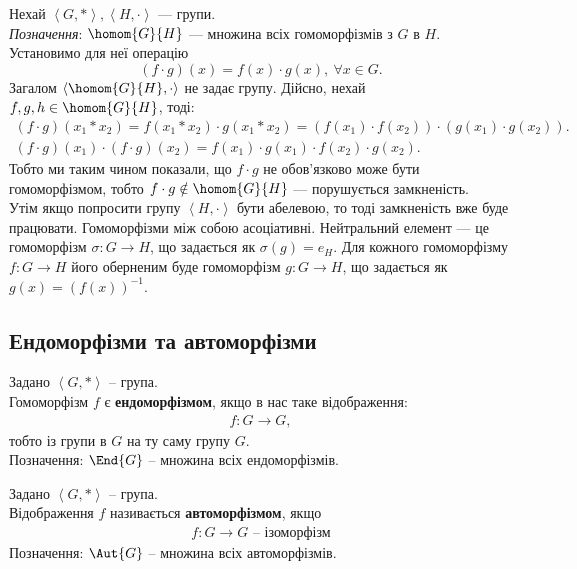 \documentclass{math_library}
\begin{document}
Нехай $\left< G, * \right>, \left< H, \cdot \right>$ --- групи.\\
\textit{Позначення}: $\homom{G}{H}$ --- множина всіх гомоморфізмів з $G$ в $H$.\\
Установимо для неї операцію 
\[
(f \cdot g)(x) = f(x) \cdot g(x),\ \forall x \in G.
\]
Загалом $\left< \homom{G}{H}, \cdot \right>$ не задає групу. Дійсно, нехай $f,g,h \in \homom{G}{H}$, тоді:
\begin{align*}
(f \cdot g)(x_1 * x_2) = f(x_1 * x_2) \cdot g(x_1 * x_2) = (f(x_1) \cdot f(x_2)) \cdot (g(x_1) \cdot g(x_2)). \\
(f \cdot g)(x_1) \cdot (f \cdot g)(x_2) = f(x_1) \cdot g(x_1) \cdot f(x_2) \cdot g(x_2).
\end{align*}
Тобто ми таким чином показали, що $f \cdot g$ не обов'язково може бути гомоморфізмом, тобто $f \cdot g \notin \homom{G}{H}$ --- порушується замкненість.
\bigskip \\
Утім якщо попросити групу $\left< H,\cdot \right>$ бути абелевою, то тоді замкненість вже буде працювати. Гомоморфізми між собою асоціативні. Нейтральний елемент --- це гомоморфізм $\sigma \colon G \to H$, що задається як $\sigma(g) = e_H$. Для кожного гомоморфізму $f \colon G \to H$ його оберненим буде гомоморфізм $g \colon G \to H$, що задається як $g(x) = (f(x))^{-1}$.


\iffalse
\subsection{Ендоморфізми та автоморфізми}
\begin{definition}
Задано $\left< G, * \right>$ -- група.\\
Гомоморфізм $f$ є \textbf{ендоморфізмом}, якщо в нас таке відображення:
\begin{align*}
f \colon G \to G,
\end{align*}
тобто із групи в $G$ на ту саму групу $G$.\\
Позначення: $\End{G}$ -- множина всіх ендоморфізмів.
\end{definition}

\begin{definition}
Задано $\left< G, * \right>$ -- група.\\
Відображення $f$ називається \textbf{автоморфізмом}, якщо
\begin{align*}
f \colon G \to G \text{ -- ізоморфізм}
\end{align*}
Позначення: $\Aut{G}$ -- множина всіх автоморфізмів.
\end{definition}
\end{document}
